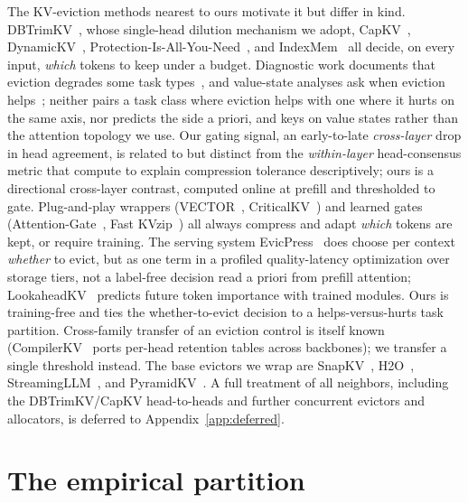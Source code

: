 \documentclass{article}
\begin{document}
The KV-eviction methods nearest to ours motivate it but differ in kind.
DBTrimKV~\citep{arxiv260509649}, whose single-head dilution mechanism we adopt,
CapKV~\citep{arxiv260425975}, DynamicKV~\citep{arxiv241214838},
Protection-Is-All-You-Need~\citep{arxiv260518053}, and
IndexMem~\citep{arxiv260525475} all decide, on every input, \emph{which} tokens
to keep under a budget. Diagnostic work documents that eviction degrades some
task types~\citep{arxiv251000231}, and value-state analyses ask when eviction
helps~\citep{arxiv260508234}; neither pairs a task class where eviction helps
with one where it hurts on the same axis, nor predicts the side a priori, and
\citet{arxiv260508234} keys on value states rather than the attention topology
we use. Our gating signal, an early-to-late \emph{cross-layer} drop in head
agreement, is related to but distinct from the \emph{within-layer} head-consensus
metric that \citet{arxiv260301426} compute to explain compression tolerance
descriptively; ours is a directional cross-layer contrast, computed online at
prefill and thresholded to gate. Plug-and-play wrappers
(VECTOR~\citealp{arxiv260523258}, CriticalKV~\citealp{arxiv250203805}) and learned
gates (Attention-Gate~\citealp{arxiv241012876}, Fast
KVzip~\citealp{arxiv260117668}) all always compress and adapt \emph{which} tokens
are kept, or require training. The serving system EvicPress~\citep{arxiv251214946} does choose
per context \emph{whether} to evict, but as one term in a profiled
quality-latency optimization over storage tiers, not a label-free decision read
a priori from prefill attention; LookaheadKV~\citep{arxiv260310899} predicts
future token importance with trained modules. Ours is training-free and ties the
whether-to-evict decision to a helps-versus-hurts task partition. Cross-family
transfer of an eviction control is itself known (CompilerKV~\citep{arxiv260208686}
ports per-head retention tables across backbones); we transfer a single threshold
instead. The base evictors we wrap are SnapKV~\citep{arxiv240414469},
H2O~\citep{arxiv230614048}, StreamingLLM~\citep{arxiv230917453}, and
PyramidKV~\citep{arxiv240602069}. A full treatment of all neighbors, including the
DBTrimKV/CapKV head-to-heads and further concurrent evictors and allocators, is
deferred to Appendix~\ref{app:deferred}.

\section{The empirical partition}
\label{sec:partition}
\end{document}

